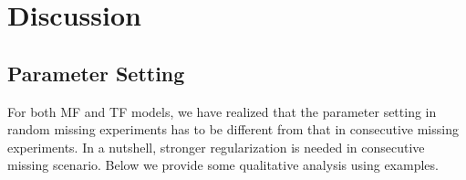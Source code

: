 \section{Discussion}  \label{sec:disc}



\subsection{Parameter Setting} \label{subsec:parameter}

For both MF and TF models, we have realized that the parameter setting in random missing experiments has to be different from that in consecutive missing experiments. In a nutshell, stronger regularization is needed in consecutive missing scenario. Below we provide some qualitative analysis using examples. 

